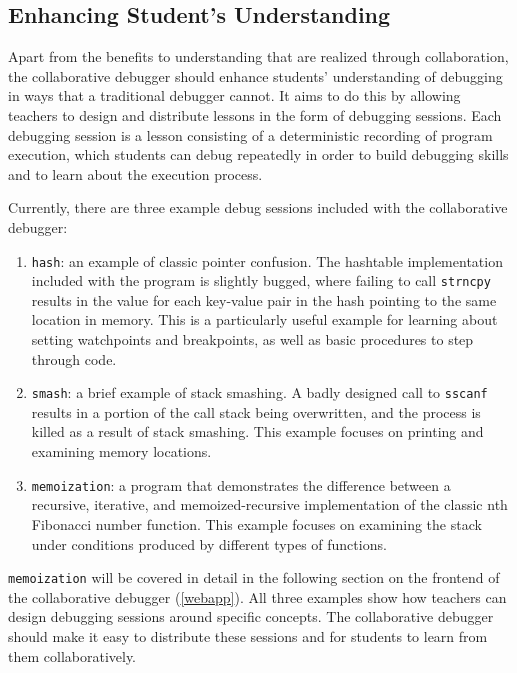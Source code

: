 \documentclass[12pt]{article}
\begin{document}
\subsection{Enhancing Student's Understanding}

Apart from the benefits to understanding that are realized through
collaboration, the collaborative debugger should enhance students'
understanding of debugging in ways that a traditional debugger cannot.
It aims to do this by allowing teachers to design and distribute
lessons in the form of debugging sessions.  Each debugging session is
a lesson consisting of a deterministic recording of program execution,
which students can debug repeatedly in order to build debugging skills
and to learn about the execution process.
\par

Currently, there are three example debug sessions included with the
collaborative debugger:

\begin{enumerate}
\item \lstinline{hash}: an example of classic pointer confusion.  The
  hashtable implementation included with the program is slightly
  bugged, where failing to call \lstinline{strncpy} results in the
  value for each key-value pair in the hash pointing to the same
  location in memory.  This is a particularly useful example for
  learning about setting watchpoints and breakpoints, as well as basic
  procedures to step through code.
\item \lstinline{smash}: a brief example of stack smashing.  A badly
  designed call to \lstinline{sscanf} results in a portion of the call
  stack being overwritten, and the process is killed as a result of
  stack smashing.  This example focuses on printing and examining
  memory locations.
\item \lstinline{memoization}: a program that demonstrates the
  difference between a recursive, iterative, and memoized-recursive
  implementation of the classic nth Fibonacci number function.  This
  example focuses on examining the stack under conditions produced by
  different types of functions.
\end{enumerate}

\lstinline{memoization} will be covered in detail in the following
section on the frontend of the collaborative debugger (\ref{webapp}).
All three examples show how teachers can design debugging sessions
around specific concepts.  The collaborative debugger should make it
easy to distribute these sessions and for students to learn from them
collaboratively.
\par
\end{document}
